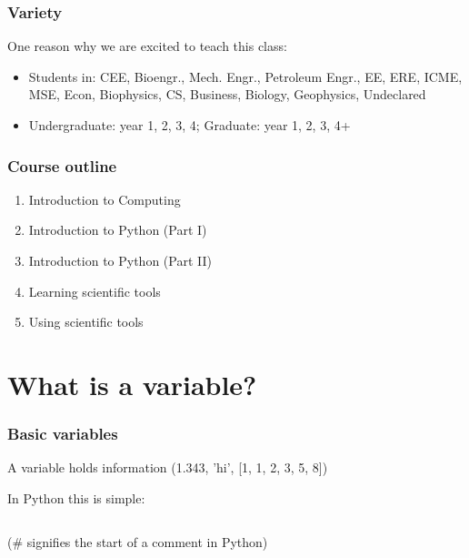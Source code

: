 \documentclass{beamer}
\begin{document}
\begin{frame}
\frametitle{Variety}
One reason why we are excited to teach this class:

\begin{itemize}
\item{Students in: CEE, Bioengr., Mech. Engr., Petroleum Engr., EE, ERE, ICME, MSE, Econ, Biophysics, CS, Business, Biology, Geophysics, Undeclared}
\item{Undergraduate: year 1, 2, 3, 4; Graduate: year 1, 2, 3, 4+}
\end{itemize}

\end{frame}


\begin{frame}
\frametitle{Course outline}

\begin{enumerate}
\setlength{\itemsep}{0.2in}

\item{Introduction to Computing}
\item{Introduction to Python (Part I)}
\item{Introduction to Python (Part II)}
\item{Learning scientific tools}
\item{Using scientific tools}

\end{enumerate}

\end{frame}



\section{What is a variable?}
\begin{frame}
\frametitle{Basic variables}

A variable holds information (1.343, 'hi', [1, 1, 2, 3, 5, 8])

\vspace{0.2in}

In Python this is simple:

\begin{center}
\begin{tabular}{c}

\end{tabular}
\end{center}

(\textcolor{thegreen}{\#} signifies the start of a comment in Python)

\end{frame}
\end{document}
